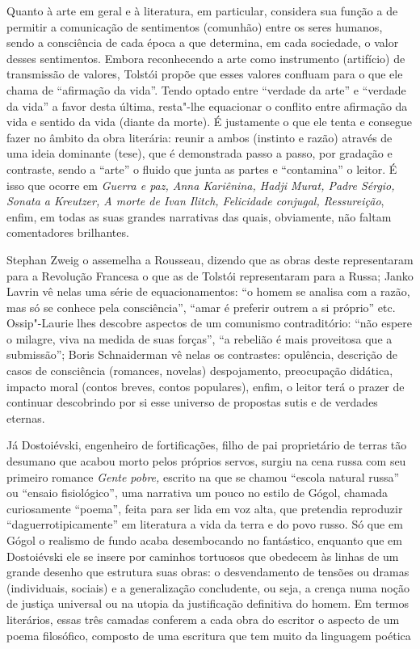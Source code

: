 {{Quanto à arte em geral e à literatura, em particular, considera sua
função a de permitir a comunicação de sentimentos (comunhão) entre os
seres humanos, sendo a consciência de cada época a que determina, em
cada sociedade, o valor desses sentimentos. Embora reconhecendo a arte
como instrumento (artifício) de transmissão de valores, Tolstói propõe
que esses valores confluam para o que ele chama de ``afirmação da
vida''. Tendo optado entre ``verdade da arte'' e ``verdade da vida''
a favor desta última, resta"-lhe equacionar o conflito entre afirmação da
vida e sentido da vida (diante da morte). É justamente o que ele tenta e
consegue fazer no âmbito da obra literária: reunir a ambos (instinto e
razão) através de uma ideia dominante (tese), que é demonstrada passo a
passo, por gradação e contraste, sendo a ``arte'' o fluido que junta as
partes e ``contamina'' o leitor. É isso que ocorre em \emph{Guerra e
paz, Anna Kariênina, Hadji Murat, Padre Sérgio, Sonata a Kreutzer, A
morte de Ivan Ilitch, Felicidade conjugal, Ressureição}, enfim, em todas
as suas grandes narrativas das quais, obviamente, não faltam comentadores
brilhantes.

Stephan Zweig o assemelha a Rousseau, dizendo que as obras deste
representaram para a Revolução Francesa o que as de Tolstói
representaram para a Russa; Janko Lavrin vê nelas uma série de
equacionamentos: ``o homem se analisa com a razão, mas só se conhece
pela consciência'', ``amar é preferir outrem a si próprio'' etc. Ossip"-Laurie lhes descobre aspectos de um
comunismo contraditório: ``não espere o milagre, viva na medida de
suas forças'', ``a rebelião é mais proveitosa que a submissão''; Boris
Schnaiderman vê nelas os contrastes: opulência, descrição de casos de
consciência (romances, novelas)  despojamento, preocupação didática,
impacto moral (contos breves, contos populares), enfim, o leitor terá o
prazer de continuar descobrindo por si esse universo de propostas sutis
e de verdades eternas.

Já Dostoiévski, engenheiro de fortificações, filho de pai proprietário
de terras tão desumano que acabou morto pelos próprios servos, surgiu na
cena russa com seu primeiro romance \emph{Gente pobre,} escrito na que
se chamou ``escola natural russa'' ou ``ensaio fisiológico'', uma narrativa um pouco no estilo de Gógol,
chamada curiosamente ``poema'', feita para ser lida em voz alta, que
pretendia reproduzir ``daguerrotipicamente'' em literatura a vida da terra e do povo russo.
Só que em Gógol o realismo de fundo acaba desembocando no fantástico,
enquanto que em Dostoiévski ele se insere por caminhos tortuosos que
obedecem às linhas de um grande desenho que estrutura suas obras: o
desvendamento de tensões ou dramas (individuais, sociais) e a generalização concludente, ou seja, a crença
numa noção de justiça universal ou na utopia da justificação definitiva
do homem. Em termos literários, essas três camadas conferem a cada obra
do escritor o aspecto de um poema filosófico, composto de uma escritura
que tem muito da linguagem poética

}}
